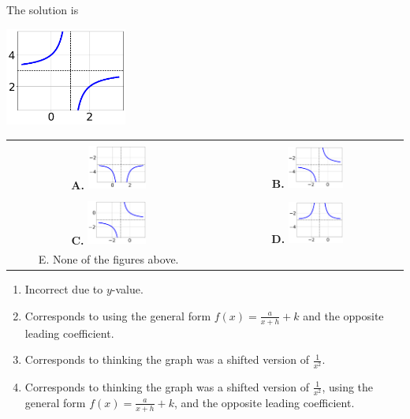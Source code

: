 \documentclass{extbook}[14pt]
\begin{document}
 
 The solution is  
 \begin{center} \includegraphics[width=0.3\textwidth]{../Figures/rationalEquationToGraphEA.png} \end{center}\begin{tabular}{|c|c|} 
\hline 
 & \tabularnewline 
 \textbf{A.} \includegraphics[width=0.3\textwidth]{../Figures/rationalEquationToGraphAA.png} & \textbf{B.} \includegraphics[width=0.3\textwidth]{../Figures/rationalEquationToGraphBA.png} \tabularnewline 
\hline 
 & \tabularnewline 
 \textbf{C.} \includegraphics[width=0.3\textwidth]{../Figures/rationalEquationToGraphCA.png} & \textbf{D.} \includegraphics[width=0.3\textwidth]{../Figures/rationalEquationToGraphDA.png} \tabularnewline 
\hline 
 E. None of the figures above. & \tabularnewline 
\hline 
 \end{tabular} 
 
\begin{enumerate}[label=\Alph*.] 
\item Incorrect due to $y$-value.  
\item Corresponds to using the general form $f(x) = \frac{a}{x+h}+k$ and the opposite leading coefficient.  
\item Corresponds to thinking the graph was a shifted version of $\frac{1}{x^2}$.  
\item Corresponds to thinking the graph was a shifted version of $\frac{1}{x^2}$, using the general form $f(x) = \frac{a}{x+h}+k$, and the opposite leading coefficient.  
\end{enumerate} 
 
\end{document}
